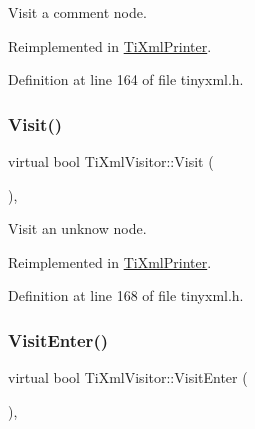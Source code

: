 Visit a comment node. 



Reimplemented in \hyperlink{class_ti_xml_printer_a9870423f5603630e6142f6bdb66dfb57}{Ti\+Xml\+Printer}.



Definition at line 164 of file tinyxml.\+h.

\hypertarget{class_ti_xml_visitor_a7e284d607d275c51dac1adb58159ce28}{}\label{class_ti_xml_visitor_a7e284d607d275c51dac1adb58159ce28} 
\subsubsection{\texorpdfstring{Visit()}{Visit()}\hspace{0.1cm}{\footnotesize\ttfamily [4/4]}}
{\footnotesize\ttfamily virtual bool Ti\+Xml\+Visitor\+::\+Visit (\begin{DoxyParamCaption}\item[{const \hyperlink{class_ti_xml_unknown}{Ti\+Xml\+Unknown} \&}]{ }\end{DoxyParamCaption})\hspace{0.3cm}{\ttfamily [inline]}, {\ttfamily [virtual]}}



Visit an unknow node. 



Reimplemented in \hyperlink{class_ti_xml_printer_a08591a15c9a07afa83c24e08b03d6358}{Ti\+Xml\+Printer}.



Definition at line 168 of file tinyxml.\+h.

\hypertarget{class_ti_xml_visitor_a07baecb52dd7d8716ae2a48ad0956ee0}{}\label{class_ti_xml_visitor_a07baecb52dd7d8716ae2a48ad0956ee0} 
\subsubsection{\texorpdfstring{Visit\+Enter()}{VisitEnter()}\hspace{0.1cm}{\footnotesize\ttfamily [1/2]}}
{\footnotesize\ttfamily virtual bool Ti\+Xml\+Visitor\+::\+Visit\+Enter (\begin{DoxyParamCaption}\item[{const \hyperlink{class_ti_xml_document}{Ti\+Xml\+Document} \&}]{ }\end{DoxyParamCaption})\hspace{0.3cm}{\ttfamily [inline]}, {\ttfamily [virtual]}}



